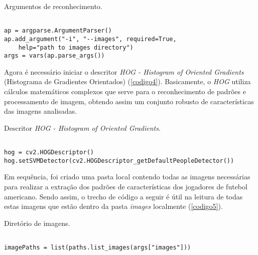 \clearpage

\begin{listing}[ht]
\caption{\label{codigo3}Argumentos de reconhecimento.}
\begin{verbatim}

ap = argparse.ArgumentParser()
ap.add_argument("-i", "--images", required=True,
    help="path to images directory")
args = vars(ap.parse_args())

\end{verbatim}
\end{listing}

Agora é necessário iniciar o descritor \textit{HOG - Histogram of Oriented Gradients} (Histograma de Gradientes Orientados) (\autoref{codigo4}). Basicamente, o \textit{HOG} utiliza cálculos matemáticos complexos que serve para o reconhecimento de padrões e processamento de imagem, obtendo assim um conjunto robusto de características das imagens analisadas.

\begin{listing}[ht]
\caption{\label{codigo4}Descritor \textit{HOG - Histogram of Oriented Gradients}.}
\begin{verbatim}

hog = cv2.HOGDescriptor()
hog.setSVMDetector(cv2.HOGDescriptor_getDefaultPeopleDetector())

\end{verbatim}
\end{listing}

Em sequência, foi criado uma pasta local contendo todas as imagens necessárias para realizar a extração dos padrões de características dos jogadores de futebol americano. Sendo assim, o trecho de código a seguir é útil na leitura de todas estas imagens que estão dentro da pasta \textit{images} localmente (\autoref{codigo5}).

\begin{listing}[ht]
\caption{\label{codigo5}Diretório de imagens.}
\begin{verbatim}

imagePaths = list(paths.list_images(args["images"]))

\end{verbatim}
\end{listing}

